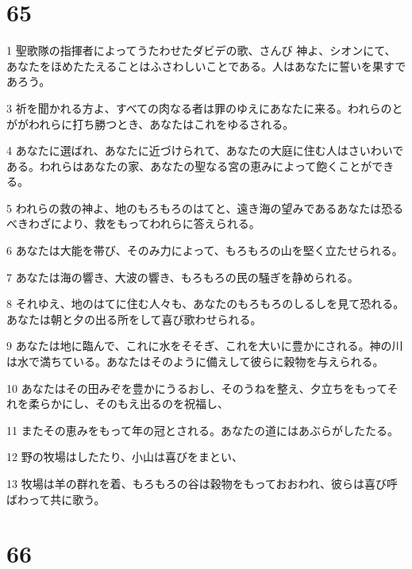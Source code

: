 \chapter{65}

\par 1 聖歌隊の指揮者によってうたわせたダビデの歌、さんび 神よ、シオンにて、あなたをほめたたえることはふさわしいことである。人はあなたに誓いを果すであろう。
\par 3 祈を聞かれる方よ、すべての肉なる者は罪のゆえにあなたに来る。われらのとががわれらに打ち勝つとき、あなたはこれをゆるされる。
\par 4 あなたに選ばれ、あなたに近づけられて、あなたの大庭に住む人はさいわいである。われらはあなたの家、あなたの聖なる宮の恵みによって飽くことができる。
\par 5 われらの救の神よ、地のもろもろのはてと、遠き海の望みであるあなたは恐るべきわざにより、救をもってわれらに答えられる。
\par 6 あなたは大能を帯び、そのみ力によって、もろもろの山を堅く立たせられる。
\par 7 あなたは海の響き、大波の響き、もろもろの民の騒ぎを静められる。
\par 8 それゆえ、地のはてに住む人々も、あなたのもろもろのしるしを見て恐れる。あなたは朝と夕の出る所をして喜び歌わせられる。
\par 9 あなたは地に臨んで、これに水をそそぎ、これを大いに豊かにされる。神の川は水で満ちている。あなたはそのように備えして彼らに穀物を与えられる。
\par 10 あなたはその田みぞを豊かにうるおし、そのうねを整え、夕立ちをもってそれを柔らかにし、そのもえ出るのを祝福し、
\par 11 またその恵みをもって年の冠とされる。あなたの道にはあぶらがしたたる。
\par 12 野の牧場はしたたり、小山は喜びをまとい、
\par 13 牧場は羊の群れを着、もろもろの谷は穀物をもっておおわれ、彼らは喜び呼ばわって共に歌う。

\chapter{66}

